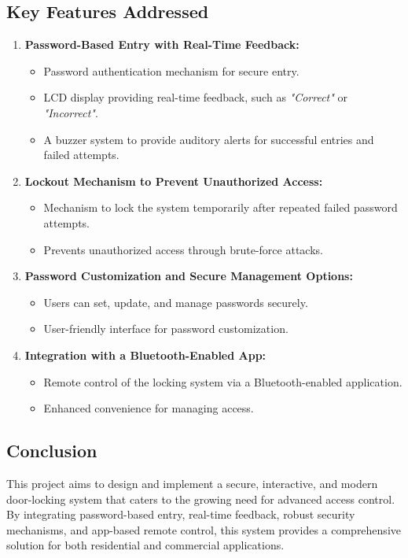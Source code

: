 \documentclass[a4paper, 12pt]{article}
\begin{document}
\subsection*{Key Features Addressed}
\begin{enumerate}
    \item \textbf{Password-Based Entry with Real-Time Feedback:}
    \begin{itemize}
        \item Password authentication mechanism for secure entry.
        \item LCD display providing real-time feedback, such as \textit{"Correct"} or \textit{"Incorrect"}.
        \item A buzzer system to provide auditory alerts for successful entries and failed attempts.
    \end{itemize}
    
    \item \textbf{Lockout Mechanism to Prevent Unauthorized Access:}
    \begin{itemize}
        \item Mechanism to lock the system temporarily after repeated failed password attempts.
        \item Prevents unauthorized access through brute-force attacks.
    \end{itemize}
    
    \item \textbf{Password Customization and Secure Management Options:}
    \begin{itemize}
        \item Users can set, update, and manage passwords securely.
        \item User-friendly interface for password customization.
    \end{itemize}
    
    \item \textbf{Integration with a Bluetooth-Enabled App:}
    \begin{itemize}
        \item Remote control of the locking system via a Bluetooth-enabled application.
        \item Enhanced convenience for managing access.
    \end{itemize}
\end{enumerate}

\subsection*{Conclusion}
This project aims to design and implement a secure, interactive, and modern door-locking system that caters to the growing need for advanced access control. By integrating password-based entry, real-time feedback, robust security mechanisms, and app-based remote control, this system provides a comprehensive solution for both residential and commercial applications.
\end{document}
